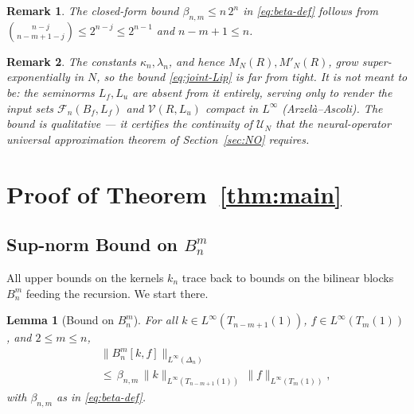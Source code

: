\documentclass[10pt,a4paper]{amsart}
\newcommand{\Linf}{L^\infty}
\newtheorem{lemma}{Lemma}
\newtheorem{remark}{Remark}
\begin{document}
\begin{remark}
\label{rem:beta-bound}
The closed-form bound $\beta_{n,m}\le n\,2^n$ in \eqref{eq:beta-def} follows from $\binom{n-j}{n-m+1-j}\le 2^{n-j}\le 2^{n-1}$ and $n-m+1\le n$.
\end{remark}

\begin{remark}
\label{rem:kappa-growth}
The constants $\kappa_n, \lambda_n$, and hence $M_N(R), M'_N(R)$, grow super-exponentially in $N$, so the bound \eqref{eq:joint-Lip} is far from tight. It is not meant to be: the seminorms $L_f, L_u$ are absent from it entirely, serving only to render the input sets $\mathcal{F}_n(B_f,L_f)$ and $\mathcal{V}(R,L_u)$ compact in $\Linf$ (Arzel\`a--Ascoli). The bound is qualitative --- it certifies the continuity of $\mathcal{U}_N$ that the neural-operator universal approximation theorem of Section~\ref{sec:NO} requires.
\end{remark}

\section{Proof of Theorem~\ref{thm:main}}
\label{sec:proof-thm1}

\subsection{Sup-norm Bound on $B_n^m$}
\label{sec:Bbound}

All upper bounds on the kernels $k_n$ trace back to bounds on the bilinear blocks $B_n^m$ feeding the recursion. We start there.

\begin{lemma}[Bound on $B_n^m$]
\label{lem:Bbound}
For all $k\in\Linf(T_{n-m+1}(1))$, $f\in\Linf(T_m(1))$, and $2\le m\le n$,
\begin{eqnarray}
&& \|B_n^m[k,f]\|_{\Linf(\Delta_n)} \nonumber \\
&& \le\, \beta_{n,m}\,\|k\|_{\Linf(T_{n-m+1}(1))}\,\|f\|_{\Linf(T_m(1))},
\label{eq:Bbound}
\end{eqnarray}
with $\beta_{n,m}$ as in \eqref{eq:beta-def}.
\end{lemma}
\end{document}
